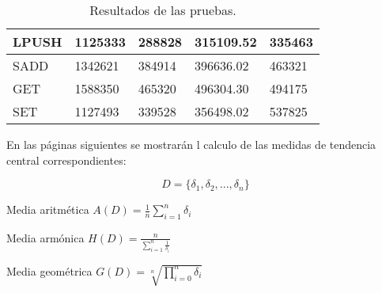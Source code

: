 \documentclass[12pt, letterpaper]{article}
\begin{document}
\begin{table}[t]
\begin{tabular}{|l|l|l|l|l|}
                                        \hspace{1.7cm} LPUSH & 1125333 & 288828 & 315109.52 & 335463 \\ \hline
                                        \hspace{1.8cm} SADD & 1342621  & 384914 & 396636.02 & 463321 \\ \hline
                                        \hspace{2cm} GET & 1588350 & 465320 & 496304.30 & 494175 \\ \hline
                                        \hspace{2cm} SET & 1127493 & 339528 & 356498.02 & 537825 \\ 
                                        \hline
                                \end{tabular}
                                \caption{Resultados de las pruebas.}
                        \end{table}

                        \hspace{.5cm}
                        En las páginas siguientes se mostrarán l calculo de las 
                        medidas de tendencia central correspondientes:
                        
                        \begin{center}
                        \end{center}

                        $$D=\{\delta_1, \delta_2, ..., \delta_n\}$$

                        \begin{center}
                                Media aritmética   \hspace{2cm}   $A(D)=\frac{1}{n}\displaystyle\sum_{i=1}^{n}\delta_{i}$
                        \end{center}

                        \begin{center}
                                Media armónica   \hspace{2cm}   $H(D)=\frac{n}{\displaystyle\sum_{i=1}^{n}\frac{1}{\delta_{i}}}$
                        \end{center}

                        \begin{center}
                                Media geométrica   \hspace{2cm}   $G(D)=\sqrt[n]{\displaystyle\prod_{i=0}^{n}\delta_{i}}$
                        \end{center}
\end{document}
